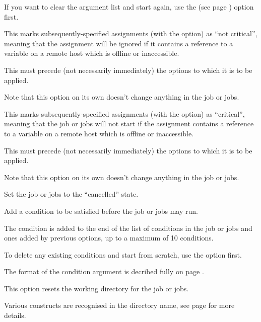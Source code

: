 If you want to clear the argument list and start again, use the  (see page \pageref{btjchange:cancarg}) option first.


This marks subsequently-specified assignments (with the  option) as ``not critical'', meaning that the assignment will be ignored if
it contains a reference to a variable on a remote host which is offline or inaccessible.

This must precede (not necessarily immediately) the  options to which it is to be applied.

Note that this option on its own doesn't change anything in the job or jobs.


This marks subsequently-specified assignments (with the  option) as
``critical'', meaning that the job or jobs will not start if the assignment contains a reference to a variable on
a remote host which is offline or inaccessible.

This must precede (not necessarily immediately) the  options to which it is to be applied.

Note that this option on its own doesn't change anything in the job or jobs.


Set the job or jobs to the ``cancelled'' state.


Add a condition to be satisfied before the job or jobs may run.

The condition is added to the end of the list of conditions in the job or jobs and ones added by previous  options, up to a maximum of 10
conditions.

To delete any existing conditions and start from scratch, use the  option first.

The format of the condition argument is decribed fully on page \pageref{btr:condfmt}.


This option resets the working directory for the job or jobs.

Various constructs are recognised in the directory name, see page \pageref{btr:directory} for more details.

